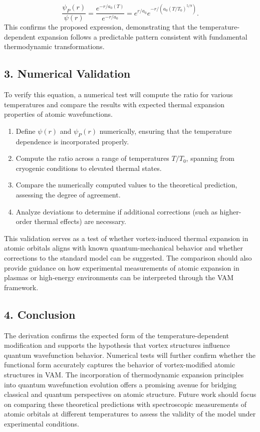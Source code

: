\[
\frac{\psi_P(r)}{\psi(r)} = \frac{e^{-r/a_0(T)}}{e^{-r/a_0}} = e^{r/a_0} e^{-r / (a_0 (T/T_0)^{5/9})}.
\]
This confirms the proposed expression, demonstrating that the temperature-dependent expansion follows a predictable pattern consistent with fundamental thermodynamic transformations.

\subsection*{3. Numerical Validation}

To verify this equation, a numerical test will compute the ratio for various temperatures and compare the results with expected thermal expansion properties of atomic wavefunctions.

\begin{enumerate}
    \item Define \(\psi(r)\) and \(\psi_P(r)\) numerically, ensuring that the temperature dependence is incorporated properly.
    \item Compute the ratio across a range of temperatures \(T/T_0\), spanning from cryogenic conditions to elevated thermal states.
\item Compare the numerically computed values to the theoretical prediction, assessing the degree of agreement.
\item Analyze deviations to determine if additional corrections (such as higher-order thermal effects) are necessary.
\end{enumerate}

This validation serves as a test of whether vortex-induced thermal expansion in atomic orbitals aligns with known quantum-mechanical behavior and whether corrections to the standard model can be suggested. The comparison should also provide guidance on how experimental measurements of atomic expansion in plasmas or high-energy environments can be interpreted through the VAM framework.

\subsection*{4. Conclusion}

The derivation confirms the expected form of the temperature-dependent modification and supports the hypothesis that vortex structures influence quantum wavefunction behavior. Numerical tests will further confirm whether the functional form accurately captures the behavior of vortex-modified atomic structures in VAM. The incorporation of thermodynamic expansion principles into quantum wavefunction evolution offers a promising avenue for bridging classical and quantum perspectives on atomic structure. Future work should focus on comparing these theoretical predictions with spectroscopic measurements of atomic orbitals at different temperatures to assess the validity of the model under experimental conditions.

